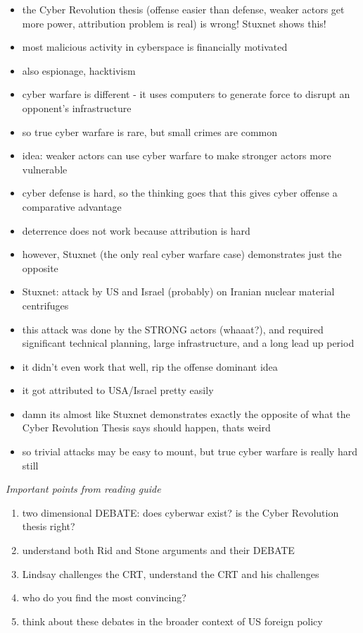 \documentclass{article}
\begin{document}
\begin{itemize}
    \item the Cyber Revolution thesis (offense easier than defense, weaker actors get more power, attribution problem is real) is wrong! Stuxnet shows this!
    \item most malicious activity in cyberspace is financially motivated
    \item also espionage, hacktivism
    \item cyber warfare is different - it uses computers to generate force to disrupt an opponent's infrastructure
    \item so true cyber warfare is rare, but small crimes are common
    \item idea: weaker actors can use cyber warfare to make stronger actors more vulnerable
    \item cyber defense is hard, so the thinking goes that this gives cyber offense a comparative advantage
    \item deterrence does not work because attribution is hard
    \item however, Stuxnet (the only real cyber warfare case) demonstrates just the opposite
    \item Stuxnet: attack by US and Israel (probably) on Iranian nuclear material centrifuges
    \item this attack was done by the STRONG actors (whaaat?), and required significant technical planning, large infrastructure, and a long lead up period
    \item it didn't even work that well, rip the offense dominant idea
    \item it got attributed to USA/Israel pretty easily
    \item damn its almost like Stuxnet demonstrates exactly the opposite of what the Cyber Revolution Thesis says should happen, thats weird
    \item so trivial attacks may be easy to mount, but true cyber warfare is really hard still
\end{itemize}
\textit{Important points from reading guide}
\begin{enumerate}
    \item two dimensional DEBATE: does cyberwar exist? is the Cyber Revolution thesis right?
    \item understand both Rid and Stone arguments and their DEBATE
    \item Lindsay challenges the CRT, understand the CRT and his challenges
    \item who do you find the most convincing?
    \item think about these debates in the broader context of US foreign policy
\end{enumerate}
\end{document}
